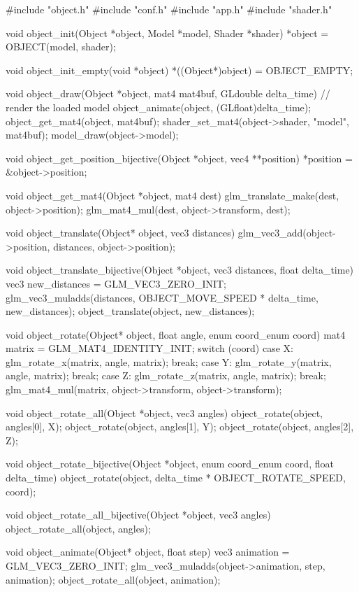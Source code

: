 \documentclass[14pt,a4paper]{extarticle}
\theoremstyle{definition}
\renewcommand{\[}{\begin{singlespace}\begin{equation*}}
\renewcommand{\]}{\end{equation*}\end{singlespace}}
\begin{document}
\begin{multicols}{2}
\begin{ccode}
#include "object.h"
#include "conf.h"
#include "app.h"
#include "shader.h"

void object_init(Object *object, Model *model, Shader *shader) {
    *object = OBJECT(model, shader);
}

void object_init_empty(void *object) {
    *((Object*)object) = OBJECT_EMPTY;
}

void object_draw(Object *object, mat4 mat4buf, GLdouble delta_time) {
    // render the loaded model
    object_animate(object, (GLfloat)delta_time);
    object_get_mat4(object, mat4buf);
    shader_set_mat4(object->shader, "model", mat4buf);
    model_draw(object->model);
}

void object_get_position_bijective(Object *object, vec4 **position) {
    *position = &object->position;
}

void object_get_mat4(Object *object, mat4 dest) {
    glm_translate_make(dest, object->position);
    glm_mat4_mul(dest, object->transform, dest);
}

void object_translate(Object* object, vec3 distances) {
    glm_vec3_add(object->position, distances, object->position);
}

void object_translate_bijective(Object *object, vec3 distances, float delta_time) {
    vec3 new_distances = GLM_VEC3_ZERO_INIT;
    glm_vec3_muladds(distances, OBJECT_MOVE_SPEED * delta_time,
                     new_distances);
    object_translate(object, new_distances);
}

void object_rotate(Object* object, float angle, enum coord_enum coord) {
    mat4 matrix = GLM_MAT4_IDENTITY_INIT;
    switch (coord) {
    case X: glm_rotate_x(matrix, angle, matrix); break;
    case Y: glm_rotate_y(matrix, angle, matrix); break;
    case Z: glm_rotate_z(matrix, angle, matrix); break;
    }
    glm_mat4_mul(matrix, object->transform, object->transform);
}

void object_rotate_all(Object *object, vec3 angles) {
    object_rotate(object, angles[0], X);
    object_rotate(object, angles[1], Y);
    object_rotate(object, angles[2], Z);
}

void object_rotate_bijective(Object *object, enum coord_enum coord,
                             float delta_time) {
    object_rotate(object, delta_time * OBJECT_ROTATE_SPEED, coord);
}

void object_rotate_all_bijective(Object *object, vec3 angles) {
    object_rotate_all(object, angles);
}

void object_animate(Object* object, float step) {
    vec3 animation = GLM_VEC3_ZERO_INIT;
    glm_vec3_muladds(object->animation, step, animation);
    object_rotate_all(object, animation);
}


\end{ccode}
\end{multicols}
\end{document}
